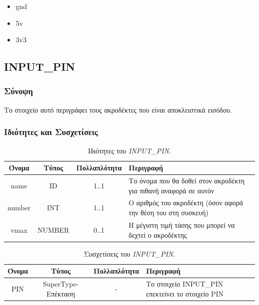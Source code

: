 \begin{itemize}
	\item gnd
	\item 5v
	\item 3v3
\end{itemize}

\subsection{INPUT\_PIN}
\label{subsec:input_pin}

\subsubsection*{Σύνοψη}

\noindent Το στοιχείο αυτό περιγράφει τους ακροδέκτες που είναι αποκλειστικά εισόδου.

\subsubsection*{Ιδιότητες και Συσχετίσεις}

\begin{table}[H]
	\begin{center}
		\caption{Ιδιότητες του \textit{INPUT\_PIN}.}
		\label{tab:input_pin1}
		\begin{tabular}{ | c | c | c| m{5.5cm} | }
			\hline
			\rowcolor{Gray}
			Όνομα & Τύπος & Πολλαπλότητα & Περιγραφή \\
			\hline
			name & ID & 1..1 & Το όνομα που θα δοθεί στον ακροδέκτη για πιθανή αναφορά σε αυτόν \\
			\hline
			number & INT & 1..1 & Ο αριθμός του ακροδέκτη (όσον αφορά την θέση του στη συσκευή) \\
			\hline
			vmax & NUMBER & 0..1 & Η μέγιστη τιμή τάσης που μπορεί να δεχτεί ο ακροδέκτης \\
			\hline
		\end{tabular}
	\end{center}
\end{table}

\begin{table}[H]
	\begin{center}
		\caption{Συσχετίσεις του \textit{INPUT\_PIN}.}
		\label{tab:input_pin2}
		\begin{tabular}{ | c | c | c| m{5.5cm} | }
			\hline
			\rowcolor{Gray}
			Όνομα & Τύπος & Πολλαπλότητα & Περιγραφή \\
			\hline
			PIN & SuperType-Επέκταση & - &  Το στοιχείο INPUT\_PIN επεκτείνει το στοιχείο PIN \\
			\hline
		\end{tabular}
	\end{center}
\end{table}

